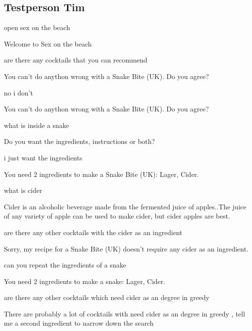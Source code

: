 \documentclass[12pt,letterpaper]{article}
\begin{document}
\subsection{Testperson Tim}
\begin{dialogue}

open sex on the beach

 Welcome to Sex on the beach

 are there any cocktails that you can recommend

 You can't do anython wrong with a Snake Bite (UK). Do you agree?

 no i don't

 You can't do anython wrong with a Snake Bite (UK). Do you agree?

 what is inside a snake

 Do you want the ingredients, instructions or both?

 i just want the ingredients

 You need 2 ingredients to make a Snake Bite (UK): Lager, Cider.

 what is cider

 Cider is an alcoholic beverage made from the fermented juice of apples..The juice of any variety of apple can be used to make cider, but cider apples are best.

 are there any other cocktails with the cider as an ingredient

 Sorry, my recipe for a Snake Bite (UK) doesn't require any cider as an ingredient.

 can you repeat the ingredients of a snake

 You need 2 ingredients to make a snake: Lager, Cider.

 are there any other cocktails which need cider as an degree in greedy

 There are probably a lot of cocktails with need cider as an degree in greedy , tell me a second ingredient to narrow down the search


\end{dialogue}
\end{document}
